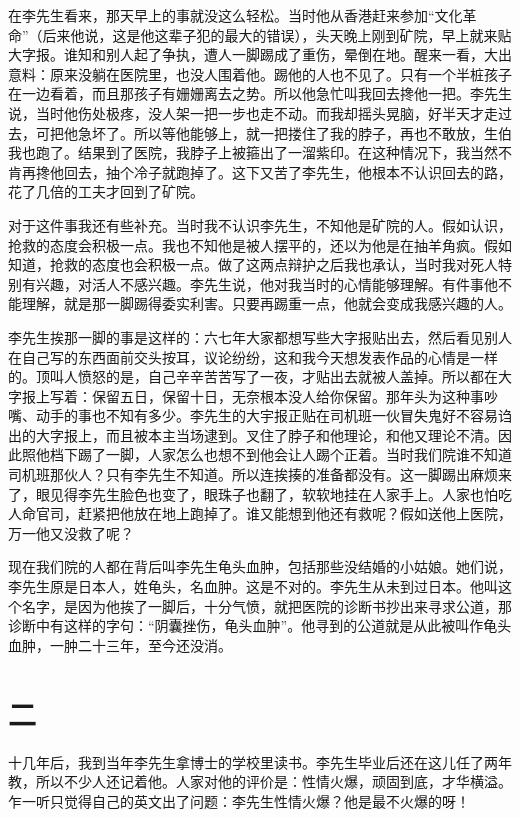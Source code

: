 在李先生看来，那天早上的事就没这么轻松。当时他从香港赶来参加“文化革命”（后来他说，这是他这辈子犯的最大的错误），头天晚上刚到矿院，早上就来贴大字报。谁知和别人起了争执，遭人一脚踢成了重伤，晕倒在地。醒来一看，大出意料：原来没躺在医院里，也没人围着他。踢他的人也不见了。只有一个半桩孩子在一边看着，而且那孩子有姗姗离去之势。所以他急忙叫我回去搀他一把。李先生说，当时他伤处极疼，没人架一把一步也走不动。而我却摇头晃脑，好半天才走过去，可把他急坏了。所以等他能够上，就一把搂住了我的脖子，再也不敢放，生伯我也跑了。结果到了医院，我脖子上被箍出了一溜紫印。在这种情况下，我当然不肯再搀他回去，抽个冷子就跑掉了。这下又苦了李先生，他根本不认识回去的路，花了几倍的工夫才回到了矿院。 

对于这件事我还有些补充。当时我不认识李先生，不知他是矿院的人。假如认识，抢救的态度会积极一点。我也不知他是被人摆平的，还以为他是在抽羊角疯。假如知道，抢救的态度也会积极一点。做了这两点辩护之后我也承认，当时我对死人特别有兴趣，对活人不感兴趣。李先生说，他对我当时的心情能够理解。有件事他不能理解，就是那一脚踢得委实利害。只要再踢重一点，他就会变成我感兴趣的人。 

李先生挨那一脚的事是这样的：六七年大家都想写些大字报贴出去，然后看见别人在自己写的东西面前交头按耳，议论纷纷，这和我今天想发表作品的心情是一样的。顶叫人愤怒的是，自己辛辛苦苦写了一夜，才贴出去就被人盖掉。所以都在大字报上写着：保留五日，保留十日，无奈根本没人给你保留。那年头为这种事吵嘴、动手的事也不知有多少。李先生的大宇报正贴在司机班一伙冒失鬼好不容易诌出的大字报上，而且被本主当场逮到。叉住了脖子和他理论，和他又理论不清。因此照他档下踢了一脚，人家怎么也想不到他会让人踢个正着。当时我们院谁不知道司机班那伙人？只有李先生不知道。所以连挨揍的准备都没有。这一脚踢出麻烦来了，眼见得李先生脸色也变了，眼珠子也翻了，软软地挂在人家手上。人家也怕吃人命官司，赶紧把他放在地上跑掉了。谁又能想到他还有救呢？假如送他上医院，万一他又没救了呢？ 

现在我们院的人都在背后叫李先生龟头血肿，包括那些没结婚的小姑娘。她们说，李先生原是日本人，姓龟头，名血肿。这是不对的。李先生从未到过日本。他叫这个名字，是因为他挨了一脚后，十分气愤，就把医院的诊断书抄出来寻求公道，那诊断中有这样的字句：“阴囊挫伤，龟头血肿”。他寻到的公道就是从此被叫作龟头血肿，一肿二十三年，至今还没消。


\section{二}

十几年后，我到当年李先生拿博士的学校里读书。李先生毕业后还在这儿任了两年教，所以不少人还记着他。人家对他的评价是：性情火爆，顽固到底，才华横溢。乍一听只觉得自己的英文出了问题：李先生性情火爆？他是最不火爆的呀！

